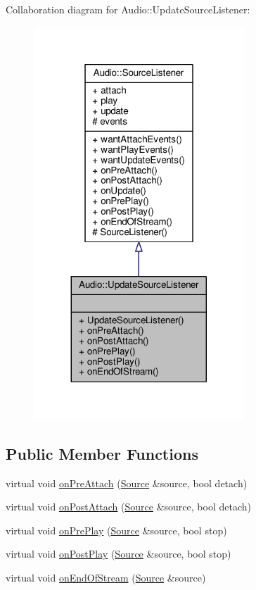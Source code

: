 Collaboration diagram for Audio\+:\+:Update\+Source\+Listener\+:
\nopagebreak
\begin{figure}[H]
\begin{center}
\leavevmode
\includegraphics[width=224pt]{d2/d0b/classAudio_1_1UpdateSourceListener__coll__graph}
\end{center}
\end{figure}
\subsection*{Public Member Functions}
\begin{DoxyCompactItemize}
\item 
virtual void \hyperlink{classAudio_1_1UpdateSourceListener_a0af524621247aad7bfab2039ab340a65}{on\+Pre\+Attach} (\hyperlink{classAudio_1_1Source}{Source} \&source, bool detach)
\item 
virtual void \hyperlink{classAudio_1_1UpdateSourceListener_ae4309512c3c5a7fd12c7ffc766215176}{on\+Post\+Attach} (\hyperlink{classAudio_1_1Source}{Source} \&source, bool detach)
\item 
virtual void \hyperlink{classAudio_1_1UpdateSourceListener_abe24b81e2c34fa6a2fc6faeed3ac61b2}{on\+Pre\+Play} (\hyperlink{classAudio_1_1Source}{Source} \&source, bool stop)
\item 
virtual void \hyperlink{classAudio_1_1UpdateSourceListener_a070f47d70e1a134490e81e841411cdef}{on\+Post\+Play} (\hyperlink{classAudio_1_1Source}{Source} \&source, bool stop)
\item 
virtual void \hyperlink{classAudio_1_1UpdateSourceListener_a0c345fe8a7fa374527ba4efc0f3d9742}{on\+End\+Of\+Stream} (\hyperlink{classAudio_1_1Source}{Source} \&source)
\end{DoxyCompactItemize}
